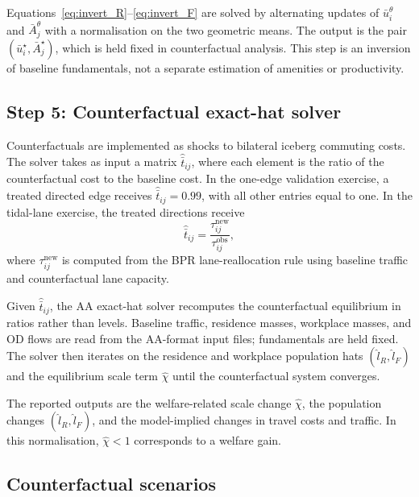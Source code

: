 \documentclass[12pt]{article}
\newcommand{\ubar}{\bar u}
\newcommand{\Abar}{\bar A}
\newcommand{\obs}{\mathrm{obs}}
\begin{document}
Equations~\eqref{eq:invert_R}--\eqref{eq:invert_F} are solved by
alternating updates of $\ubar_i^\theta$ and $\Abar_j^\theta$ with a
normalisation on the two geometric means.  The output is the pair
$(\ubar_i^{\star},\Abar_j^{\star})$, which is held fixed in
counterfactual analysis.  This step is an inversion of baseline
fundamentals, not a separate estimation of amenities or productivity.

\subsection{Step 5: Counterfactual exact-hat solver}\label{ssec:hat}

Counterfactuals are implemented as shocks to bilateral iceberg
commuting costs.  The solver takes as input a matrix
$\hat{\bar t}_{ij}$, where each element is the ratio of the
counterfactual cost to the baseline cost.  In the one-edge validation
exercise, a treated directed edge receives
$\hat{\bar t}_{ij}=0.99$, with all other entries equal to one.  In
the tidal-lane exercise, the treated directions receive
\[
\hat{\bar t}_{ij}
=
\frac{\tau_{ij}^{\mathrm{new}}}{\tau_{ij}^{\obs}},
\]
where $\tau_{ij}^{\mathrm{new}}$ is computed from the BPR
lane-reallocation rule using baseline traffic and counterfactual lane
capacity.

Given $\hat{\bar t}_{ij}$, the AA exact-hat solver recomputes the
counterfactual equilibrium in ratios rather than levels.  Baseline
traffic, residence masses, workplace masses, and OD flows are read
from the AA-format input files; fundamentals are held fixed.  The
solver then iterates on the residence and workplace population hats
$(\hat l_R,\hat l_F)$ and the equilibrium scale term $\hat\chi$
until the counterfactual system converges.

The reported outputs are the welfare-related scale change
$\hat\chi$, the population changes $(\hat l_R,\hat l_F)$, and the
model-implied changes in travel costs and traffic.  In this
normalisation, $\hat\chi<1$ corresponds to a welfare gain.


\subsection{Counterfactual scenarios}\label{ssec:scenarios}
\end{document}

